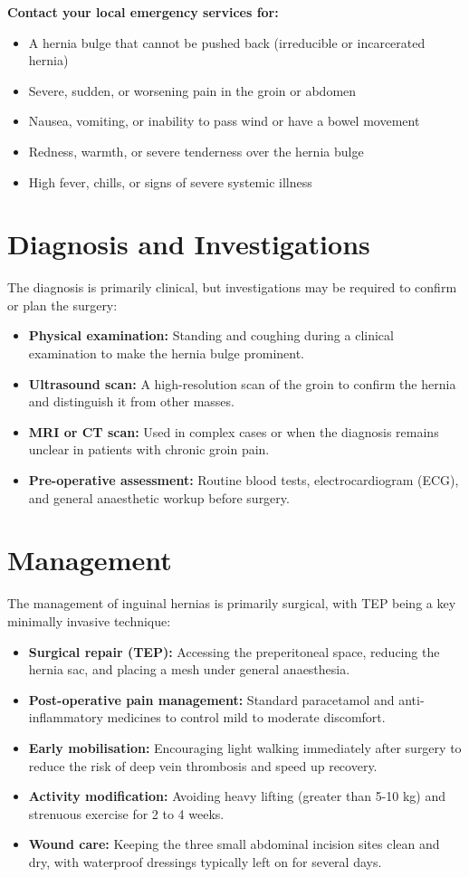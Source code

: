 \textbf{Contact your local emergency services for:}
\begin{itemize}
    \item A hernia bulge that cannot be pushed back (irreducible or incarcerated hernia)
    \item Severe, sudden, or worsening pain in the groin or abdomen
    \item Nausea, vomiting, or inability to pass wind or have a bowel movement
    \item Redness, warmth, or severe tenderness over the hernia bulge
    \item High fever, chills, or signs of severe systemic illness
\end{itemize}

\section*{Diagnosis and Investigations}
The diagnosis is primarily clinical, but investigations may be required to confirm or plan the surgery:

\begin{itemize}
    \item \textbf{Physical examination:} Standing and coughing during a clinical examination to make the hernia bulge prominent.
    \item \textbf{Ultrasound scan:} A high-resolution scan of the groin to confirm the hernia and distinguish it from other masses.
    \item \textbf{MRI or CT scan:} Used in complex cases or when the diagnosis remains unclear in patients with chronic groin pain.
    \item \textbf{Pre-operative assessment:} Routine blood tests, electrocardiogram (ECG), and general anaesthetic workup before surgery.
\end{itemize}

\section*{Management}
The management of inguinal hernias is primarily surgical, with TEP being a key minimally invasive technique:

\begin{itemize}
    \item \textbf{Surgical repair (TEP):} Accessing the preperitoneal space, reducing the hernia sac, and placing a mesh under general anaesthesia.
    \item \textbf{Post-operative pain management:} Standard paracetamol and anti-inflammatory medicines to control mild to moderate discomfort.
    \item \textbf{Early mobilisation:} Encouraging light walking immediately after surgery to reduce the risk of deep vein thrombosis and speed up recovery.
    \item \textbf{Activity modification:} Avoiding heavy lifting (greater than 5-10 kg) and strenuous exercise for 2 to 4 weeks.
    \item \textbf{Wound care:} Keeping the three small abdominal incision sites clean and dry, with waterproof dressings typically left on for several days.
\end{itemize}

